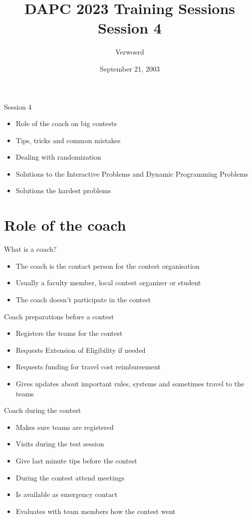 \documentclass[11pt,pdf, aspectratio=169]{beamer}
\title{DAPC 2023 Training Sessions\\Session 4}
\author{Verwoerd}
\date{September 21, 2003}
\begin{document}
  \maketitle
  \begin{frame}{Session 4}
    \begin{itemize}
      \item Role of the coach on big contests
      \item Tips, tricks and common mistakes
      \item Dealing with randomization
      \item Solutions to the Interactive Problems and Dynamic Programming Problems
      \item Solutions the hardest problems
    \end{itemize}
    \doclicenseThis
  \end{frame}


  \section{Role of the coach}
  \begin{frame}{What is a coach?}
    \begin{itemize}
      \item The coach is the contact person for the contest organisation
      \item Usually a faculty member, local contest organizer or student
      \item The coach doesn't participate in the contest
    \end{itemize}
  \end{frame}
  \begin{frame}{Coach preparations before a contest}
    \begin{itemize}
      \item Registers the teams for the contest
      \item Requests Extension of Eligibility if needed
      \item Requests funding for travel cost reimbursement
      \item Gives updates about important rules, systems and sometimes travel to the teams
    \end{itemize}
  \end{frame}
  \begin{frame}{Coach during the contest}
    \begin{itemize}
      \item Makes sure teams are registered
      \item Visits during the test session
      \item Give last minute tips before the contest
      \item During the contest attend meetings
      \item Is available as emergency contact
      \item Evaluates with team members how the contest went
    \end{itemize}
  \end{frame}
\end{document}
